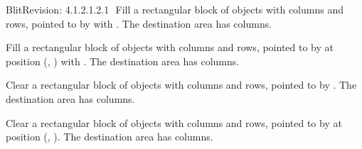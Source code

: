 \begin{manpage}{\libtitle}{Blit}{$ $Revision: 4.1.2.1.2.1 $ $}
    Fill a rectangular block of objects with  columns and
     rows, pointed to by  with . The
    destination area has  columns.

    Fill a rectangular block of objects with  columns and
     rows, pointed to by  at position (,
    ) with . The destination area has  columns.

    Clear a rectangular block of objects with  columns and
     rows, pointed to by . The destination area has
     columns.

    Clear a rectangular block of objects with  columns and
     rows, pointed to by  at position (,
    ). The destination area has  columns.


\subtitle{Revision}

\end{manpage}
